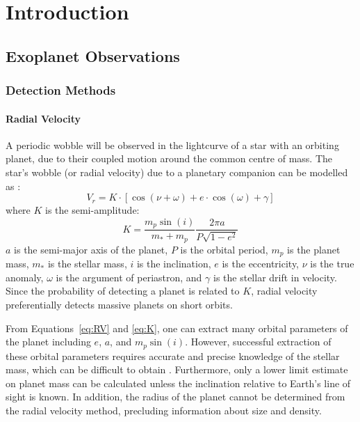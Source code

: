 \chapter{Introduction}
\label{chap:intro}

\section{Exoplanet Observations}
\subsection{Detection Methods}
\subsubsection{Radial Velocity}
\label{sec:RV}
A periodic wobble will be observed in the lightcurve of a star with an orbiting planet, due to their coupled motion around the common centre of mass. 
The star's wobble (or radial velocity) due to a planetary companion can be modelled as \citep{Beauge2007}:
\begin{equation}
V_r = K \cdot [\cos(\nu + \omega) + e\cdot \cos(\omega) + \gamma]
\label{eq:RV}
\end{equation}
where $K$ is the semi-amplitude:
\begin{equation}
K = \frac{m_p \sin(i)}{m_* + m_p} \frac{2\pi a}{P\sqrt{1-e^2}}
\label{eq:K}
\end{equation}
$a$ is the semi-major axis of the planet, $P$ is the orbital period, $m_p$ is the planet mass, $m_*$ is the stellar mass, $i$ is the inclination, $e$ is the eccentricity, $\nu$ is the true anomaly, $\omega$ is the argument of periastron, and $\gamma$ is the stellar drift in velocity.
Since the probability of detecting a planet is related to $K$, radial velocity preferentially detects massive planets on short orbits. 

From Equations~\ref{eq:RV} and \ref{eq:K}, one can extract many orbital parameters of the planet including $e$, $a$, and $m_p\sin(i)$.
However, successful extraction of these orbital parameters requires accurate and precise knowledge of the stellar mass, which can be difficult to obtain \citep[e.g.][]{Brown2011}.
Furthermore, only a lower limit estimate on planet mass can be calculated unless the inclination relative to Earth's line of sight is known. 
In addition, the radius of the planet cannot be determined from the radial velocity method, precluding information about size and density.

